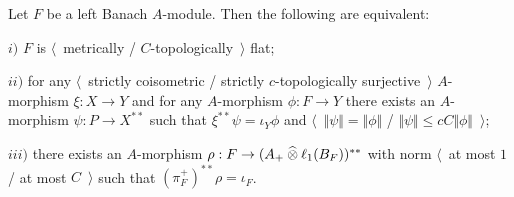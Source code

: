\begin{proposition}\label{MetTopFlatSecondDualCharac} Let $F$ be a left Banach $A$-module. Then the following are equivalent:

$i)$ $F$ is $\langle$~metrically / $C$-topologically~$\rangle$ flat;

$ii)$ for any $\langle$~strictly coisometric / strictly $c$-topologically surjective~$\rangle$ $A$-morphism $\xi:X\to Y$ and for any $A$-morphism $\phi:F\to Y$ there exists an $A$-morphism $\psi:P\to X^{**}$ such that $\xi^{**}\psi=\iota_Y\phi$ and $\langle$~$\Vert\psi\Vert=\Vert\phi\Vert$ / $\Vert\psi\Vert\leq cC\Vert\phi\Vert$~$\rangle$;

$iii)$ there exists an $A$-morphism $\rho:F\to (A_+\mathbin{\widehat{\otimes}} \ell_1(B_F))^{**}$ with norm $\langle$~at most $1$ / at most $C$~$\rangle$ such that $(\pi_F^+)^{**}\rho=\iota_F$.
\end{proposition}
